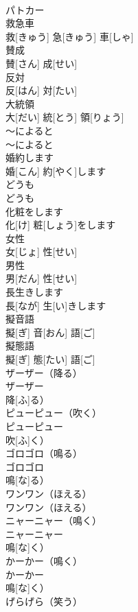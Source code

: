 \documentclass[8pt]{extreport}
\begin{document}
\begin{CJK}{UTF8}{min}
\\	パトカー		
\\	救急車	
\\	救[きゅう] 急[きゅう] 車[しゃ]		
\\	賛成	
\\	賛[さん] 成[せい]		
\\	反対	
\\	反[はん] 対[たい]		
\\	大統領	
\\	大[だい] 統[とう] 領[りょう]		
\\	～によると	
\\	～によると		
\\	婚約します	
\\	婚[こん] 約[やく]します		
\\	どうも	
\\	どうも		
\\	化粧をします	
\\	化[け] 粧[しょう]をします		
\\	女性	
\\	女[じょ] 性[せい]		
\\	男性	
\\	男[だん] 性[せい]		
\\	長生きします	
\\	長[なが] 生[い]きします		
\\	擬音語	
\\	擬[ぎ] 音[おん] 語[ご]		
\\	擬態語	
\\	擬[ぎ] 態[たい] 語[ご]		
\\	ザーザー（降る）	
\\	ザーザー
\\	降[ふ]る）		
\\	ピューピュー（吹く）	
\\	ピューピュー
\\	吹[ふ]く）		
\\	ゴロゴロ（鳴る）	
\\	ゴロゴロ
\\	鳴[な]る）		
\\	ワンワン（ほえる）	
\\	ワンワン（ほえる）		
\\	ニャーニャー（鳴く）	
\\	ニャーニャー
\\	鳴[な]く）		
\\	かーかー（鳴く）	
\\	かーかー
\\	鳴[な]く）		
\\	げらげら（笑う）	

\end{CJK}
\end{document}
